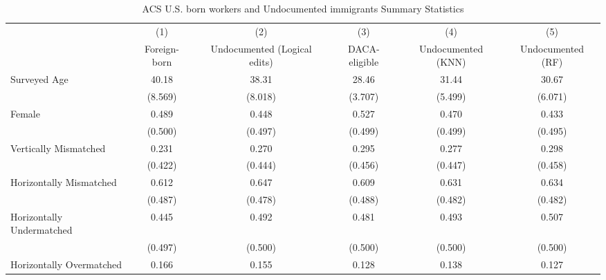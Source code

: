 \begin{table}[htbp]\centering
\def\sym#1{\ifmmode^{#1}\else\(^{#1}\)\fi}
\caption{ACS U.S. born workers and Undocumented immigrants Summary Statistics \label{tab:sum}}
\begin{tabular}{l*{5}{c}}
\hline\hline
                    &\multicolumn{1}{c}{(1)}         &\multicolumn{1}{c}{(2)}         &\multicolumn{1}{c}{(3)}         &\multicolumn{1}{c}{(4)}         &\multicolumn{1}{c}{(5)}         \\
                    &Foreign-born         &Undocumented (Logical edits)         &DACA-eligible         &Undocumented (KNN)         &Undocumented (RF)         \\
\hline
Surveyed Age        &       40.18         &       38.31         &       28.46         &       31.44         &       30.67         \\
                    &     (8.569)         &     (8.018)         &     (3.707)         &     (5.499)         &     (6.071)         \\
[1em]
Female              &       0.489         &       0.448         &       0.527         &       0.470         &       0.433         \\
                    &     (0.500)         &     (0.497)         &     (0.499)         &     (0.499)         &     (0.495)         \\
[1em]
Vertically Mismatched&       0.231         &       0.270         &       0.295         &       0.277         &       0.298         \\
                    &     (0.422)         &     (0.444)         &     (0.456)         &     (0.447)         &     (0.458)         \\
[1em]
Horizontally Mismatched&       0.612         &       0.647         &       0.609         &       0.631         &       0.634         \\
                    &     (0.487)         &     (0.478)         &     (0.488)         &     (0.482)         &     (0.482)         \\
[1em]
Horizontally Undermatched&       0.445         &       0.492         &       0.481         &       0.493         &       0.507         \\
                    &     (0.497)         &     (0.500)         &     (0.500)         &     (0.500)         &     (0.500)         \\
[1em]
Horizontally Overmatched&       0.166         &       0.155         &       0.128         &       0.138         &       0.127         \\

\end{tabular}
\end{table}
